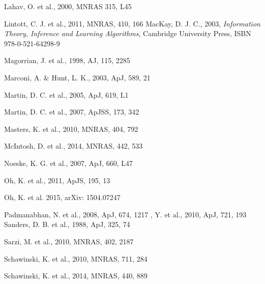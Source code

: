 \documentclass[useAMS,usenatbib]{mn2e}
\begin{document}
\begin{thebibliography}{}
 Lahav, O. et al., 2000, MNRAS 315, L45

 Lintott, C. J. et al., 2011, MNRAS, 410, 166
 MacKay, D. J. C., 2003, \emph{Information Theory, Inference and Learning Algorithms}, Cambridge University Press, ISBN 978-0-521-64298-9

 Magorrian, J. et al., 1998, AJ, 115, 2285

 Marconi, A. \& Hunt, L. K., 2003, ApJ, 589, 21

 Martin, D. C. et al., 2005, ApJ, 619, L1


 Martin, D. C. et al., 2007, ApJSS, 173, 342

 Masters, K. et al., 2010, MNRAS, 404, 792

 McIntosh, D. et al., 2014, MNRAS, 442, 533

 Noeske, K. G. et al., 2007, ApJ, 660, L47


 Oh, K. et al., 2011, ApJS, 195, 13

 Oh, K. et al. 2015, arXiv: 1504.07247

 Padmanabhan, N. et al., 2008, ApJ, 674, 1217
 , Y. et al., 2010, ApJ, 721, 193
 Sanders, D. B. et al., 1988, ApJ, 325, 74

 Sarzi, M. et al., 2010, MNRAS, 402, 2187

 Schawinski, K. et al., 2010, MNRAS, 711, 284

 Schawinski, K. et al., 2014, MNRAS, 440, 889


\end{thebibliography}
\end{document}
